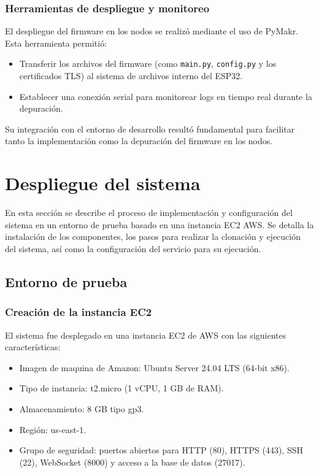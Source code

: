 \subsubsection{Herramientas de despliegue y monitoreo}

El despliegue del firmware en los nodos se realizó mediante el uso de PyMakr.
Esta herramienta permitió:

\begin{itemize}
    \item Transferir los archivos del firmware (como \texttt{main.py}, \texttt{config.py}
          y los certificados TLS) al sistema de archivos interno del ESP32.
    \item Establecer una conexión serial para monitorear logs en tiempo real durante la
          depuración.
\end{itemize}

Su integración con el entorno de desarrollo resultó fundamental para facilitar
tanto la implementación como la depuración del firmware en los nodos.

\section{Despliegue del sistema}

En esta sección se describe el proceso de implementación y configuración del
sistema en un entorno de prueba basado en una instancia EC2 AWS. Se detalla la
instalación de los componentes, los pasos para realizar la clonación y
ejecución del sistema, así como la configuración del servicio para su
ejecución.

\subsection{Entorno de prueba}

\subsubsection{Creación de la instancia EC2}

El sistema fue desplegado en una instancia EC2 de AWS con las siguientes
características:

\begin{itemize}
    \item Imagen de maquina de Amazon: Ubuntu Server 24.04 LTS (64-bit x86).
    \item Tipo de instancia: t2.micro (1 vCPU, 1 GB de RAM).
    \item Almacenamiento: 8 GB tipo gp3.
    \item Región: us-east-1.
    \item Grupo de seguridad: puertos abiertos para HTTP (80), HTTPS (443), SSH (22),
          WebSocket (8000) y acceso a la base de datos (27017).
\end{itemize}


